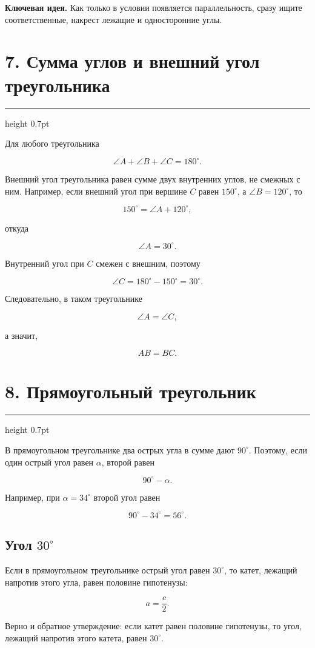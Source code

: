 \documentclass[a4paper,12pt]{article}
\newcommand{\sectionline}{%
    \vspace{-0.15em}
    {\color{accent}\hrule height 0.7pt}
    \vspace{0.55em}
}
\newcommand{\keyidea}[1]{%
    \par\noindent
    {\color{darkaccent}\textbf{Ключевая идея.}} #1\par
}
\newcommand{\formula}[1]{%
    \[
        \boxed{\displaystyle #1}
    \]
}
\begin{document}
\keyidea{Как только в условии появляется параллельность, сразу ищите
соответственные, накрест лежащие и односторонние углы.}

\section*{\color{darkaccent}7. Сумма углов и внешний угол треугольника}
\sectionline

Для любого треугольника

\formula{\angle A+\angle B+\angle C=180^\circ.}

Внешний угол треугольника равен сумме двух внутренних углов, не смежных с ним.
Например, если внешний угол при вершине $C$ равен $150^\circ$, а
$\angle B=120^\circ$, то

\[
150^\circ=\angle A+120^\circ,
\]

откуда

\[
\angle A=30^\circ.
\]

Внутренний угол при $C$ смежен с внешним, поэтому

\[
\angle C=180^\circ-150^\circ=30^\circ.
\]

Следовательно, в таком треугольнике

\[
\angle A=\angle C,
\]

а значит,

\[
AB=BC.
\]

\section*{\color{darkaccent}8. Прямоугольный треугольник}
\sectionline

В прямоугольном треугольнике два острых угла в сумме дают $90^\circ$.
Поэтому, если один острый угол равен $\alpha$, второй равен

\formula{90^\circ-\alpha.}

Например, при $\alpha=34^\circ$ второй угол равен

\[
90^\circ-34^\circ=56^\circ.
\]

\subsection*{Угол $30^\circ$}

Если в прямоугольном треугольнике острый угол равен $30^\circ$, то катет,
лежащий напротив этого угла, равен половине гипотенузы:

\formula{a=\frac{c}{2}.}

Верно и обратное утверждение: если катет равен половине гипотенузы, то угол,
лежащий напротив этого катета, равен $30^\circ$.
\end{document}

